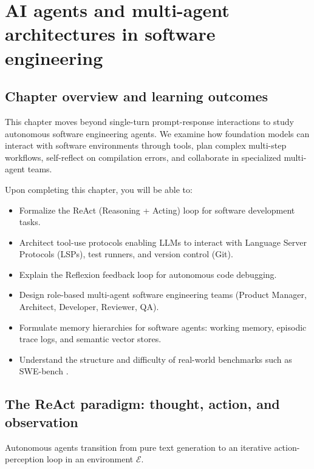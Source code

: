 \documentclass[../../main.tex]{subfiles}
\begin{document}
\chapter{AI agents and multi-agent architectures in software engineering}
\label{ch:ai_agents_multiagent}

\section{Chapter overview and learning outcomes}
This chapter moves beyond single-turn prompt-response interactions to study autonomous software engineering agents. We examine how foundation models can interact with software environments through tools, plan complex multi-step workflows, self-reflect on compilation errors, and collaborate in specialized multi-agent teams.

Upon completing this chapter, you will be able to:
\begin{itemize}
    \item Formalize the ReAct (Reasoning + Acting) loop \citep{yao2022react} for software development tasks.
    \item Architect tool-use protocols enabling LLMs to interact with Language Server Protocols (LSPs), test runners, and version control (Git).
    \item Explain the Reflexion feedback loop for autonomous code debugging.
    \item Design role-based multi-agent software engineering teams (Product Manager, Architect, Developer, Reviewer, QA).
    \item Formulate memory hierarchies for software agents: working memory, episodic trace logs, and semantic vector stores.
    \item Understand the structure and difficulty of real-world benchmarks such as SWE-bench \citep{jimenez2024swebench}.
\end{itemize}

\section{The ReAct paradigm: thought, action, and observation}
Autonomous agents transition from pure text generation to an iterative action-perception loop in an environment $\mathcal{E}$.
\end{document}
